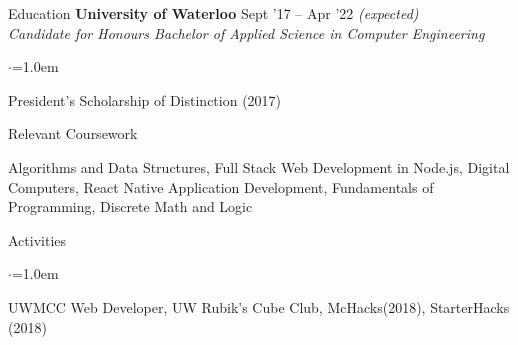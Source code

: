 \documentclass{resume} %
\begin{document}
\begin{rSection}{Education}
  {\bf University of Waterloo} \hfill {Sept '17 -- Apr '22 \em (expected)} \\
  {\em Candidate for Honours Bachelor of Applied Science in Computer Engineering} %
  \begin{list}{$\cdot$}{\leftmargin=1.0em}
  \item President's Scholarship of Distinction (2017)
  \end{list}

  \begin{rProjectSection}{Relevant Coursework}{}
  \item Algorithms and Data Structures, Full Stack Web Development in Node.js, Digital Computers,
  React Native Application Development, Fundamentals of Programming, Discrete Math and Logic
  \end{rProjectSection}

\end{rSection}

\begin{rSection}{Activities}
\vspace{0.5em}
\begin{list}{$\cdot$}{\leftmargin=1.0em}
\item UWMCC Web Developer, UW Rubik's Cube Club, McHacks(2018), StarterHacks (2018)
\end{list}

\end{rSection}
\end{document}
